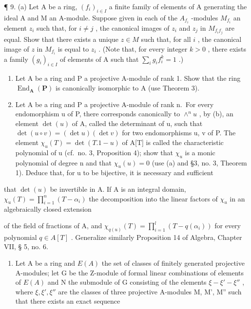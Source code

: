 ¶ 9. (a) Let A be a ring, \((f_i)_{i \in I}\) a finite family of elements of A generating the ideal A and M an A-module. Suppose given in each of the \(A_{f_i}\) -modules \(M_{f_i}\) an element \(z_i\) such that, for \(i \neq j\) , the canonical images of \(z_i\) and \(z_j\) in \(M_{f_i f_j}\) are equal. Show that there exists a unique \(z \in M\) such that, for all \(i\) , the canonical image of \(z\) in \(M_{f_i}\) is equal to \(z_i\) . (Note that, for every integer \(k > 0\) , there exists a family \((g_i)_{i \in I}\) of elements of A such that \(\sum_{i} g_i f_i^k = 1\) .)

\begin{enumerate}
\def\labelenumi{(\alph{enumi})}
\setcounter{enumi}{1}
\item
  Let A be a ring and P a projective A-module of rank 1. Show that the ring \(\operatorname{End}_{\mathbf{A}}(\mathbf{P})\) is canonically isomorphic to A (use Theorem 3).
\item
  Let A be a ring and P a projective A-module of rank n.~For every endomorphism u of P, there corresponds canonically to \(\wedge^{n}u\) , by (b), an element \(\det(u)\) of A, called the determinant of u, such that \(\det(u \circ v) = (\det u)(\det v)\) for two endomorphisms u, v of P. The element \(\chi_{u}(T) = \det(T.1 - u)\) of A{[}T{]} is called the characteristic polynomial of u (cf.~no. 3, Proposition 4); show that \(\chi_{u}\) is a monic polynomial of degree n and that \(\chi_{u}(u) = 0\) (use (a) and §3, no. 3, Theorem 1). Deduce that, for u to be bijective, it is necessary and sufficient
\end{enumerate}

that \(\det(u)\) be invertible in A. If A is an integral domain, \(\chi_u(T) = \prod_{i=1}^{n} (T - \alpha_i)\) the decomposition into the linear factors of \(\chi_u\) in an algebraically closed extension

of the field of fractions of A, and \(\chi_{q(u)}(T) = \prod_{i=1}^{l} (T - q(\alpha_i))\) for every polynomial \(q \in A[T]\) . Generalize similarly Proposition 14 of Algebra, Chapter VII, § 5, no. 6.

\begin{enumerate}
\def\labelenumi{\arabic{enumi}.}
\setcounter{enumi}{9}
\tightlist
\item
  Let A be a ring and \(E(A)\) the set of classes of finitely generated projective A-modules; let G be the Z-module of formal linear combinations of elements of \(E(A)\) and N the submodule of G consisting of the elements \(\xi - \xi' - \xi''\) , where \(\xi, \xi', \xi''\) are the classes of three projective A-modules M, M', M'' such that there exists an exact sequence
\end{enumerate}

